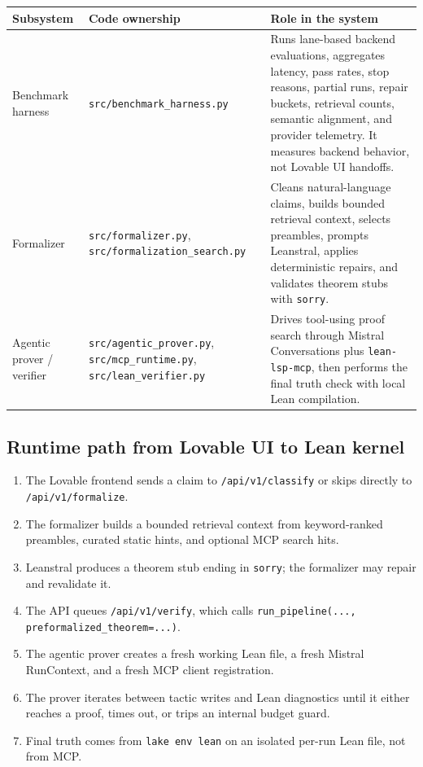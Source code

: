\documentclass[11pt]{article}
\begin{document}
\begin{tabularx}{\textwidth}{>{\raggedright\arraybackslash}p{} >{\raggedright\arraybackslash}p{} Y}
\toprule
Subsystem & Code ownership & Role in the system \\
\midrule
Benchmark harness & \texttt{src/benchmark\_harness.py} & Runs lane-based backend evaluations, aggregates latency, pass rates, stop reasons, partial runs, repair buckets, retrieval counts, semantic alignment, and provider telemetry. It measures backend behavior, not Lovable UI handoffs. \\
Formalizer & \texttt{src/formalizer.py}, \texttt{src/formalization\_search.py} & Cleans natural-language claims, builds bounded retrieval context, selects preambles, prompts Leanstral, applies deterministic repairs, and validates theorem stubs with \texttt{sorry}. \\
Agentic prover / verifier & \texttt{src/agentic\_prover.py}, \texttt{src/mcp\_runtime.py}, \texttt{src/lean\_verifier.py} & Drives tool-using proof search through Mistral Conversations plus \texttt{lean-lsp-mcp}, then performs the final truth check with local Lean compilation. \\
\bottomrule
\end{tabularx}

\subsection*{Runtime path from Lovable UI to Lean kernel}

\begin{enumerate}[leftmargin=1.5em]
  \item The Lovable frontend sends a claim to \texttt{/api/v1/classify} or
  skips directly to \texttt{/api/v1/formalize}.
  \item The formalizer builds a bounded retrieval context from keyword-ranked
  preambles, curated static hints, and optional MCP search hits.
  \item Leanstral produces a theorem stub ending in \texttt{sorry}; the
  formalizer may repair and revalidate it.
  \item The API queues \texttt{/api/v1/verify}, which calls
  \texttt{run\_pipeline(..., preformalized\_theorem=...)}.
  \item The agentic prover creates a fresh working Lean file, a fresh Mistral
  RunContext, and a fresh MCP client registration.
  \item The prover iterates between tactic writes and Lean diagnostics until it
  either reaches a proof, times out, or trips an internal budget guard.
  \item Final truth comes from \texttt{lake env lean} on an isolated per-run
  Lean file, not from MCP.
\end{enumerate}
\end{document}
